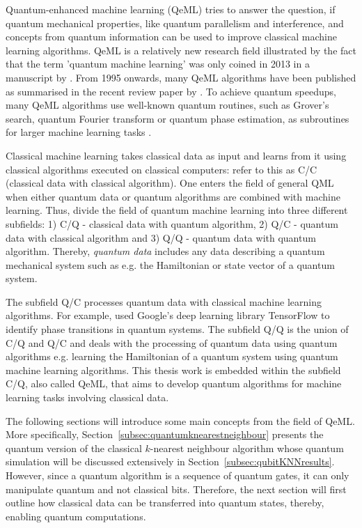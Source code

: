 Quantum-enhanced machine learning (QeML) tries to answer the question, if quantum mechanical properties, like quantum parallelism and interference, and concepts from quantum information can be used to improve classical machine learning algorithms. QeML is a relatively new research field illustrated by the fact that the term 'quantum machine learning' was only coined in 2013 in a manuscript by . From 1995 onwards, many QeML algorithms have been published as summarised in the recent review paper by . To achieve quantum speedups, many QeML algorithms use well-known quantum routines, such as Grover's search, quantum Fourier transform or quantum phase estimation, as subroutines for larger machine learning tasks \cite{aimeur2013quantum,anguita2003quantum,biamonte2016quantum,kapoor2016quantum,lloyd2013quantum}.

Classical machine learning takes classical data as input and learns from it using classical algorithms executed on classical computers:  refer to this as C/C (classical data with classical algorithm). One enters the field of general QML when either quantum data or quantum algorithms are combined with machine learning. Thus,  divide the field of quantum machine learning into three different subfields: 1) C/Q - classical data with quantum algorithm, 2) Q/C - quantum data with classical algorithm and 3) Q/Q - quantum data with quantum algorithm. Thereby, \emph{quantum data} includes any data describing a quantum mechanical system such as e.g. the Hamiltonian or state vector of a quantum system.

The subfield Q/C processes quantum data with classical machine learning algorithms. For example,  used Google's deep learning library TensorFlow to identify phase transitions in quantum systems. The subfield Q/Q is the union of C/Q and Q/C and deals with the processing of quantum data using quantum algorithms e.g. learning the Hamiltonian of a quantum system using quantum machine learning algorithms. This thesis work is embedded within the subfield C/Q, also called QeML, that aims to develop quantum algorithms for machine learning tasks involving classical data.

The following sections will introduce some main concepts from the field of QeML. More specifically, Section~\ref{subsec:quantumknearestneighbour} presents the quantum version of the classical $k$-nearest neighbour algorithm whose quantum simulation will be discussed extensively in Section~\ref{subsec:qubitKNNresults}. However, since a quantum algorithm is a sequence of quantum gates, it can only manipulate quantum and not classical bits. Therefore, the next section will first outline how classical data can be transferred into quantum states, thereby, enabling quantum computations.

